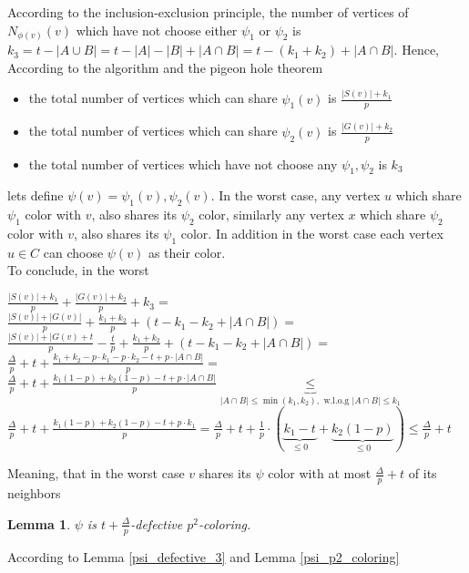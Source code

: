 \documentclass[11pt]{article}
\newtheorem{lemma}[theorem]{Lemma}
\begin{document}
According to the inclusion-exclusion principle, the number of vertices of $N_{\phi(v)}(v)$ which have not choose either $\psi_1$ or $\psi_2$ is $k_3 = t - |A \cup B| = t - |A| - |B| + |A \cap B| = t - (k_1 + k_2) + |A \cap B|$.
Hence, According to the algorithm and the pigeon hole theorem
\begin{itemize}
    \item the total number of vertices which can share $\psi_1(v)$ is $\frac{|S(v)| + k_1}{p}$
    \item the total number of vertices which can share $\psi_2(v)$ is $\frac{|G(v)| + k_2}{p}$
    \item the total number of vertices which have not choose any $\psi_1, \psi_2$ is $k_3$
\end{itemize}
lets define $\psi(v) = \psi_1(v), \psi_2(v)$. In the worst case, any vertex $u$ which share $\psi_1$ color with $v$, also shares its $\psi_2$ color, similarly any vertex $x$ which share $\psi_2$ color with $v$, also shares its $\psi_1$ color. In addition in the worst case each vertex $u \in C$ can choose $\psi(v)$ as their color. \\
To conclude, in the worst
\begin{doublespacing}
\newline
$\frac{|S(v)| + k_1}{p} + \frac{|G(v)| + k_2}{p} + k_3 =$
\\[5mm]
$\frac{|S(v)| + |G(v)|}{p} + \frac{k_1 + k_2}{p} + (t - k_1 - k_2 +  |A \cap B|) =$ 
\\[5mm] 
$\frac{|S(v)| + |G(v) +t }{p} - \frac{t}{p} + \frac{k_1 + k_2}{p} + (t - k_1 - k_2 +  |A \cap B|) =$
\\[5mm]
$\frac{\Delta}{p} + t + \frac{k_1 + k_2 - p \cdot k_1 - p \cdot k_2 - t + p  \cdot  |A \cap B|}{p}  = $
\\[5mm]
$\frac{\Delta}{p} + t + \frac{k_1(1-p) + k_2(1-p) - t + p  \cdot  |A \cap B|}{p} \underbrace{\le}_{|A \cap B| \le \min({k_1, k_2}), \text{ w.l.o.g } |A \cap B| \le k_1}$
\\[5mm]  
$\frac{\Delta}{p} + t + \frac{k_1(1-p) + k_2(1-p) - t + p \cdot k_1}{p} =  \frac{\Delta}{p} + t + \frac{1}{p} \cdot (\underbrace{k_1 - t}_{\le 0} + \underbrace{k_2(1-p)}_{\le 0}) \le  \boxed{\frac{\Delta}{p} + t}$
\end{doublespacing}


Meaning, that in the worst case $v$ shares its $\psi$ color with at most $\frac{\Delta}{p} + t$ of its neighbors


\begin{lemma}
$\psi$ is $t+\frac{\Delta}{p}$-defective $p^2$-coloring.
\end{lemma}
According to Lemma \ref{psi_defective_3} and Lemma \ref{psi_p2_coloring}
\end{document}
